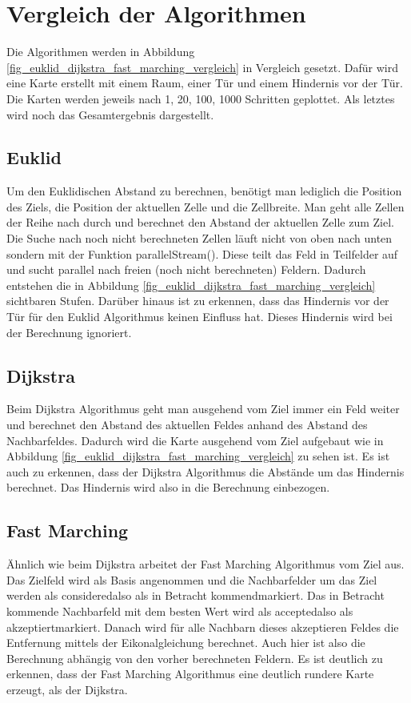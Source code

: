 \section{Vergleich der Algorithmen}
Die Algorithmen werden in Abbildung \ref{fig_euklid_dijkstra_fast_marching_vergleich} in Vergleich gesetzt. Dafür wird eine Karte erstellt mit einem Raum, einer Tür und einem Hindernis vor der Tür. Die Karten werden jeweils nach 1, 20, 100, 1000 Schritten geplottet. Als letztes wird noch das Gesamtergebnis dargestellt.

\subsection{Euklid}
Um den Euklidischen Abstand zu berechnen, benötigt man lediglich die Position des Ziels, die Position der aktuellen Zelle und die Zellbreite. Man geht alle Zellen der Reihe nach durch und berechnet den Abstand der aktuellen Zelle zum Ziel. Die Suche nach noch nicht berechneten Zellen läuft nicht von oben nach unten sondern mit der Funktion \glqq parallelStream()\grqq . Diese teilt das Feld in Teilfelder auf und sucht parallel nach freien (noch nicht berechneten) Feldern. Dadurch entstehen die in Abbildung \ref{fig_euklid_dijkstra_fast_marching_vergleich} sichtbaren Stufen. \cite{JavaParallelism} Darüber hinaus ist zu erkennen, dass das Hindernis vor der Tür für den Euklid Algorithmus keinen Einfluss hat. Dieses Hindernis wird bei der Berechnung ignoriert.

\subsection{Dijkstra}
Beim Dijkstra Algorithmus geht man ausgehend vom Ziel immer ein Feld weiter und berechnet den Abstand des aktuellen Feldes anhand des Abstand des Nachbarfeldes. Dadurch wird die Karte ausgehend vom Ziel aufgebaut wie in Abbildung \ref{fig_euklid_dijkstra_fast_marching_vergleich} zu sehen ist. Es ist auch zu erkennen, dass der Dijkstra Algorithmus die Abstände um das Hindernis berechnet. Das Hindernis wird also in die Berechnung einbezogen.

\subsection{Fast Marching}
Ähnlich wie beim Dijkstra arbeitet der Fast Marching Algorithmus vom Ziel aus. Das Zielfeld wird als Basis angenommen und die Nachbarfelder um das Ziel werden als \glqq considered\grqq also als \glqq in Betracht kommend\grqq markiert. Das in Betracht kommende Nachbarfeld mit dem besten Wert wird als \glqq accepted\grqq also als \glqq akzeptiert\grqq markiert. Danach wird für alle Nachbarn dieses akzeptieren Feldes die Entfernung mittels der Eikonalgleichung berechnet. Auch hier ist also die Berechnung abhängig von den vorher berechneten Feldern. Es ist deutlich zu erkennen, dass der Fast Marching Algorithmus eine deutlich rundere Karte erzeugt, als der Dijkstra.

